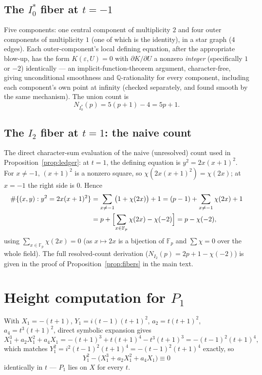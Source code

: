 \documentclass[11pt]{amsart}
\theoremstyle{definition}
\newcommand{\Fp}{\mathbb{F}_p}
\newcommand{\Q}{\mathbb{Q}}
\begin{document}
\subsection*{The \texorpdfstring{$I_0^*$}{I0*} fiber at \texorpdfstring{$t=-1$}{t=-1}}

Five components: one central component of multiplicity $2$ and four outer components of multiplicity $1$ (one of which is the identity), in a star graph (4 edges). Each outer-component's local defining equation, after the appropriate blow-up, has the form $K(\varepsilon,U)=0$ with $\partial K/\partial U$ a nonzero \emph{integer} (specifically $1$ or $-2$) identically — an implicit-function-theorem argument, character-free, giving unconditional smoothness and $\Q$-rationality for every component, including each component's own point at infinity (checked separately, and found smooth by the same mechanism). The union count is
\[
N_{I_0^*}(p) = 5(p+1)-4 = 5p+1.
\]

\subsection*{The \texorpdfstring{$I_2$}{I2} fiber at \texorpdfstring{$t=1$}{t=1}: the naive count}

The direct character-sum evaluation of the naive (unresolved) count used in Proposition~\ref{prop:ledger}: at $t=1$, the defining equation is $y^2=2x(x+1)^2$. For $x\ne-1$, $(x+1)^2$ is a nonzero square, so $\chi(2x(x+1)^2)=\chi(2x)$; at $x=-1$ the right side is $0$. Hence
\begin{align*}
\#\{(x,y):y^2=2x(x+1)^2\} &= \sum_{x\ne-1}\bigl(1+\chi(2x)\bigr) + 1 = (p-1)+\sum_{x\ne-1}\chi(2x)+1 \\
&= p+\Bigl[\sum_{x\in\Fp}\chi(2x)-\chi(-2)\Bigr]=p-\chi(-2),
\end{align*}
using $\sum_{x\in\Fp}\chi(2x)=0$ (as $x\mapsto2x$ is a bijection of $\Fp$ and $\sum\chi=0$ over the whole field). The full resolved-count derivation ($N_{I_2}(p)=2p+1-\chi(-2)$) is given in the proof of Proposition~\ref{prop:fibers} in the main text.

\section{Height computation for \texorpdfstring{$P_1$}{P1}}
\label{app:height}

With $X_1=-(t+1)$, $Y_1=i(t-1)(t+1)^2$, $a_2=t(t+1)^2$, $a_4=t^3(t+1)^2$, direct symbolic expansion gives
\[
X_1^3+a_2X_1^2+a_4X_1 = -(t+1)^3+t(t+1)^4-t^3(t+1)^3 = -(t-1)^2(t+1)^4,
\]
which matches $Y_1^2=i^2(t-1)^2(t+1)^4=-(t-1)^2(t+1)^4$ exactly, so
\[
Y_1^2-\bigl(X_1^3+a_2X_1^2+a_4X_1\bigr)\equiv0
\]
identically in $t$ — $P_1$ lies on $X$ for every $t$.
\end{document}
